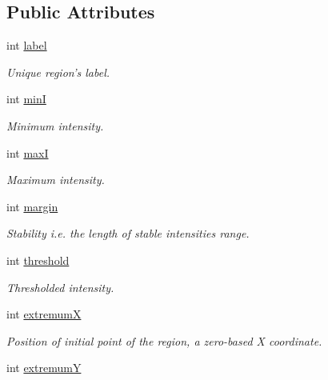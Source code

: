\subsection*{Public Attributes}
\begin{CompactItemize}
\item 
int \hyperlink{structextrema_1_1Region_d0ec4b02009e61677ecf09f2931b7a45}{label}
\begin{CompactList}\small\item\em Unique region's label. \item\end{CompactList}\item 
int \hyperlink{structextrema_1_1Region_1e0837d519914c5bb629e9908d2ff476}{min\-I}
\begin{CompactList}\small\item\em Minimum intensity. \item\end{CompactList}\item 
int \hyperlink{structextrema_1_1Region_287284a6ae0cc41e3db3d78cbbe91b2c}{max\-I}
\begin{CompactList}\small\item\em Maximum intensity. \item\end{CompactList}\item 
int \hyperlink{structextrema_1_1Region_ff74e77ae3765704b06fbc76e8b8d4cf}{margin}
\begin{CompactList}\small\item\em Stability i.e. the length of stable intensities range. \item\end{CompactList}\item 
int \hyperlink{structextrema_1_1Region_e982d7dbf40e25fc6b8e16f2a5f3b9fe}{threshold}
\begin{CompactList}\small\item\em Thresholded intensity. \item\end{CompactList}\item 
int \hyperlink{structextrema_1_1Region_0743e8f53fccbbac44a5d2131d371d37}{extremum\-X}
\begin{CompactList}\small\item\em Position of initial point of the region, a zero-based X coordinate. \item\end{CompactList}\item 
int \hyperlink{structextrema_1_1Region_9863f6b21977493df9c7e48ab336e09c}{extremum\-Y}

\end{CompactItemize}
